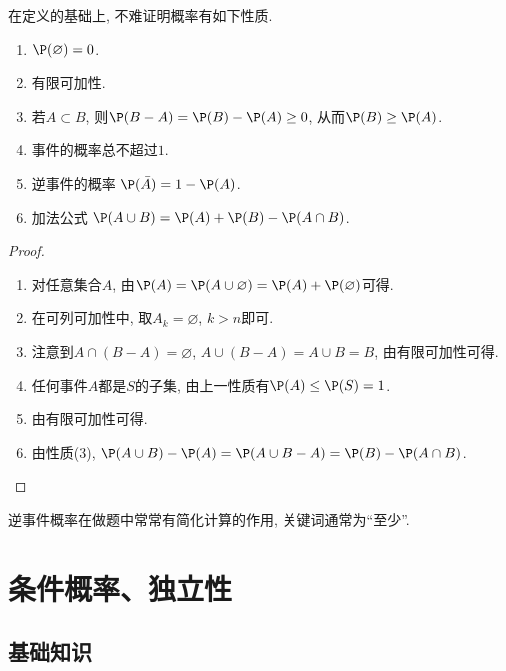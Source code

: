 \documentclass[11pt]{ctexart}
\begin{document}
在定义的基础上, 不难证明概率有如下性质. 
\begin{enumerate}[label=(\arabic*)]
	\item $\P(\varnothing) = 0$. 
	\item {\keben 有限可加性}. 
	\item 若$A \subset B$, 则$\P(B - A) = \P(B) - \P(A) \geq 0$, 从而$\P(B) \geq \P(A)$.  
	\item 事件的概率总不超过$1$. 
	\item {\keben 逆事件的概率} $\P(\bar A) = 1 - \P(A)$. 
	\item {\keben 加法公式} $\P(A \cup B) = \P(A) + \P(B) - \P(A \cap B)$.
\end{enumerate}
\begin{proof}
	\begin{enumerate}[label=(\arabic*)]
		\item 对任意集合$A$, 由$\P(A) = \P(A \cup \varnothing) = \P(A) + \P(\varnothing)$可得. 
		\item 在可列可加性中, 取$A_k = \varnothing$, $k > n$即可. 
		\item 注意到$A \cap (B - A) = \varnothing$, $A \cup (B - A) = A \cup B = B$, 由有限可加性可得.
		\item 任何事件$A$都是$S$的子集, 由上一性质有$\P(A) \leq \P(S) = 1$. 
		\item 由有限可加性可得. 
		\item  由性质(3), $\P(A \cup B) - \P(A) = \P(A \cup B - A) = \P(B) - \P(A \cap B)$. 
	\end{enumerate}
\end{proof}

\begin{remark}
	逆事件概率在做题中常常有简化计算的作用, 关键词通常为“至少”. 
\end{remark}

\section{条件概率、独立性}

\subsection{基础知识}
\end{document}
